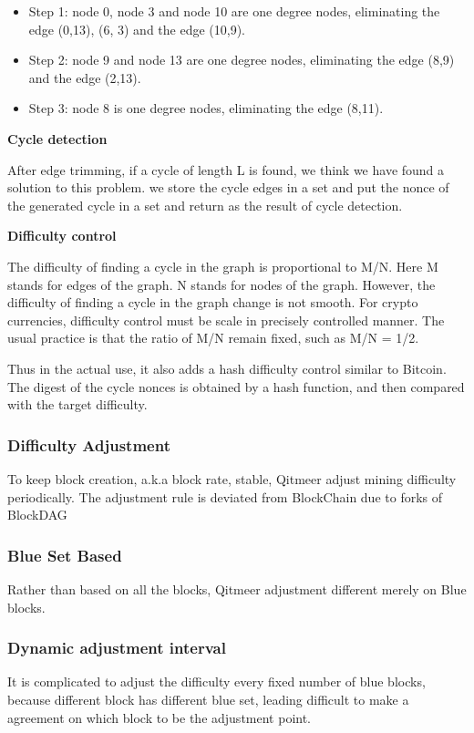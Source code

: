 \documentclass[a4paper,11pt]{article}
\begin{document}
\begin{itemize}
	\item Step 1: node 0, node 3 and node 10 are one degree nodes, eliminating the edge (0,13), (6, 3) and the edge (10,9).
	\item Step 2: node 9 and node 13 are one degree nodes, eliminating the edge (8,9) and the edge (2,13).
	\item Step 3: node 8 is one degree nodes, eliminating the edge (8,11).
\end{itemize}


\textbf{Cycle detection}

After edge trimming, if a cycle of length L is found, we think we have found a solution to this problem.
we store the cycle edges in a set and put the nonce of the generated cycle in a set and
return as the result of cycle detection.


\textbf{Difficulty control}

The difficulty of finding a cycle in the graph is proportional to M/N. Here M stands for edges of the graph.
N stands for nodes of the graph. However, the difficulty of finding a cycle in the graph change is not smooth.
For crypto currencies, difficulty control must be scale in precisely controlled manner. The usual practice is
that the ratio of M/N remain fixed, such as M/N = 1/2.

Thus in the actual use, it also adds a hash difficulty control similar to Bitcoin. The digest of the cycle nonces is obtained by a hash function,
and then compared with the target difficulty.

\subsubsection{Difficulty Adjustment}
To keep block creation, a.k.a block rate, stable, Qitmeer adjust mining difficulty periodically. 
The adjustment rule is deviated from BlockChain due to forks of BlockDAG

\subsubsection*{Blue Set Based}
Rather than based on all the blocks, Qitmeer adjustment different merely on Blue blocks. 

\subsubsection*{Dynamic adjustment interval}
It is complicated to adjust the difficulty every fixed number of blue blocks, because different block has different blue set, leading difficult to make a agreement on which block to be the adjustment point.
\end{document}
